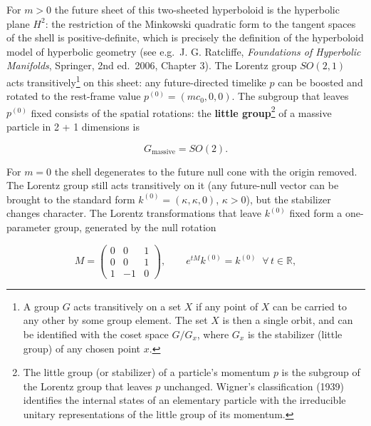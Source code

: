 \documentclass[
]{article}
\begin{document}
For \(m > 0\) the future sheet of this two-sheeted hyperboloid is the
hyperbolic plane \(H^{2}\): the restriction of the Minkowski quadratic
form to the tangent spaces of the shell is positive-definite, which is
precisely the definition of the hyperboloid model of hyperbolic geometry
(see e.g.~J. G. Ratcliffe, \emph{Foundations of Hyperbolic Manifolds},
Springer, 2nd ed.~2006, Chapter 3). The Lorentz group \(SO(2, 1)\) acts
transitively\footnote{A group \(G\) acts transitively on a set \(X\) if
  any point of \(X\) can be carried to any other by some group element.
  The set \(X\) is then a single orbit, and can be identified with the
  coset space \(G / G_{x}\), where \(G_{x}\) is the stabilizer (little
  group) of any chosen point \(x\).} on this sheet: any future-directed
timelike \(p\) can be boosted and rotated to the rest-frame value
\(p^{(0)} = (mc_{0}, 0, 0)\). The subgroup that leaves \(p^{(0)}\) fixed
consists of the spatial rotations: the \textbf{little group}\footnote{The
  little group (or stabilizer) of a particle's momentum \(p\) is the
  subgroup of the Lorentz group that leaves \(p\) unchanged. Wigner's
  classification (1939) identifies the internal states of an elementary
  particle with the irreducible unitary representations of the little
  group of its momentum.} of a massive particle in 2 + 1 dimensions is

\[G_{\mathrm{massive}} = SO(2). \tag{70}\]

For \(m = 0\) the shell degenerates to the future null cone with the
origin removed. The Lorentz group still acts transitively on it (any
future-null vector can be brought to the standard form
\(k^{(0)} = (\kappa, \kappa, 0)\), \(\kappa > 0\)), but the stabilizer
changes character. The Lorentz transformations that leave \(k^{(0)}\)
fixed form a one-parameter group, generated by the null rotation

\[M = \begin{pmatrix} 0 & 0 & 1 \\ 0 & 0 & 1 \\ 1 & -1 & 0 \end{pmatrix}, \qquad e^{tM} k^{(0)} = k^{(0)} \;\; \forall\, t \in \mathbb{R}, \tag{71}\]
\end{document}
